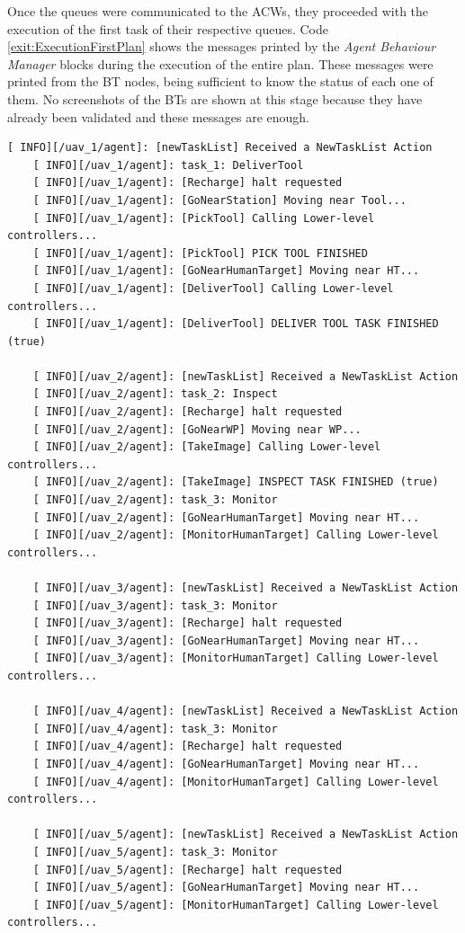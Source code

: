 Once the queues were communicated to the \glspl{ACW}, they proceeded with the execution of the first task of their respective queues. Code \ref{exit:ExecutionFirstPlan} shows the messages printed by the \emph{Agent Behaviour Manager} blocks during the execution of the entire plan. These messages were printed from the \gls{BT} nodes, being sufficient to know the status of each one of them.  No screenshots of the \glspl{BT} are shown at this stage because they have already been validated and these messages are enough.

\begin{lstlisting}[caption={Feedback messages printed by \emph{Agent Behaviour Managers} during the plan execution}, breaklines=true, label=exit:ExecutionFirstPlan]
    [ INFO][/uav_1/agent]: [newTaskList] Received a NewTaskList Action
    [ INFO][/uav_1/agent]: task_1: DeliverTool
    [ INFO][/uav_1/agent]: [Recharge] halt requested
    [ INFO][/uav_1/agent]: [GoNearStation] Moving near Tool...
    [ INFO][/uav_1/agent]: [PickTool] Calling Lower-level controllers...
    [ INFO][/uav_1/agent]: [PickTool] PICK TOOL FINISHED
    [ INFO][/uav_1/agent]: [GoNearHumanTarget] Moving near HT...
    [ INFO][/uav_1/agent]: [DeliverTool] Calling Lower-level controllers...
    [ INFO][/uav_1/agent]: [DeliverTool] DELIVER TOOL TASK FINISHED (true)
    
    [ INFO][/uav_2/agent]: [newTaskList] Received a NewTaskList Action
    [ INFO][/uav_2/agent]: task_2: Inspect
    [ INFO][/uav_2/agent]: [Recharge] halt requested
    [ INFO][/uav_2/agent]: [GoNearWP] Moving near WP...
    [ INFO][/uav_2/agent]: [TakeImage] Calling Lower-level controllers...
    [ INFO][/uav_2/agent]: [TakeImage] INSPECT TASK FINISHED (true)
    [ INFO][/uav_2/agent]: task_3: Monitor
    [ INFO][/uav_2/agent]: [GoNearHumanTarget] Moving near HT...
    [ INFO][/uav_2/agent]: [MonitorHumanTarget] Calling Lower-level controllers...
    
    [ INFO][/uav_3/agent]: [newTaskList] Received a NewTaskList Action
    [ INFO][/uav_3/agent]: task_3: Monitor
    [ INFO][/uav_3/agent]: [Recharge] halt requested
    [ INFO][/uav_3/agent]: [GoNearHumanTarget] Moving near HT...
    [ INFO][/uav_3/agent]: [MonitorHumanTarget] Calling Lower-level controllers...
    
    [ INFO][/uav_4/agent]: [newTaskList] Received a NewTaskList Action
    [ INFO][/uav_4/agent]: task_3: Monitor
    [ INFO][/uav_4/agent]: [Recharge] halt requested
    [ INFO][/uav_4/agent]: [GoNearHumanTarget] Moving near HT...
    [ INFO][/uav_4/agent]: [MonitorHumanTarget] Calling Lower-level controllers...
    
    [ INFO][/uav_5/agent]: [newTaskList] Received a NewTaskList Action
    [ INFO][/uav_5/agent]: task_3: Monitor
    [ INFO][/uav_5/agent]: [Recharge] halt requested
    [ INFO][/uav_5/agent]: [GoNearHumanTarget] Moving near HT...
    [ INFO][/uav_5/agent]: [MonitorHumanTarget] Calling Lower-level controllers...
\end{lstlisting}

